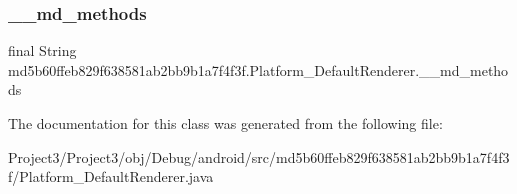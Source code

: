 \subsubsection{\texorpdfstring{\+\_\+\+\_\+md\+\_\+methods}{\_\_md\_methods}}
{\footnotesize\ttfamily final String md5b60ffeb829f638581ab2bb9b1a7f4f3f.\+Platform\+\_\+\+Default\+Renderer.\+\_\+\+\_\+md\+\_\+methods\hspace{0.3cm}{\ttfamily [static]}}



The documentation for this class was generated from the following file\+:\begin{DoxyCompactItemize}
\item 
Project3/\+Project3/obj/\+Debug/android/src/md5b60ffeb829f638581ab2bb9b1a7f4f3f/Platform\+\_\+\+Default\+Renderer.\+java\end{DoxyCompactItemize}
